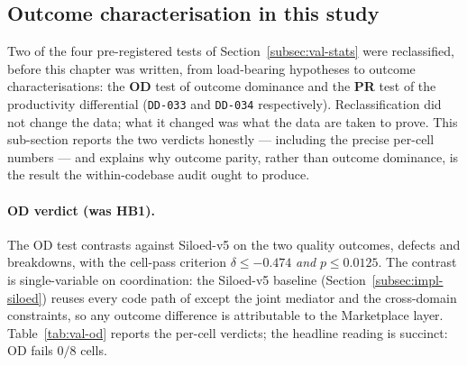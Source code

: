 \subsection{Outcome characterisation in this study}
\label{subsec:val-outcomes}

Two of the four pre-registered tests of Section~\ref{subsec:val-stats}
were reclassified, before this chapter was written, from
load-bearing hypotheses to outcome characterisations: the
\textbf{OD} test of outcome dominance and the \textbf{PR} test of
the productivity differential (\texttt{DD-033} and \texttt{DD-034}
respectively). Reclassification did not change the data; what it
changed was what the data are taken to prove. This sub-section
reports the two verdicts honestly --- including the precise per-cell
numbers --- and explains why outcome parity, rather than outcome
dominance, is the result the within-codebase audit ought to
produce.

\paragraph{OD verdict (was HB1).}
The OD test contrasts \NEXUS{} against Siloed-v5 on the two
quality outcomes, defects and breakdowns, with the cell-pass
criterion $\delta \le -0.474$ \emph{and} $p \le 0.0125$. The
contrast is single-variable on coordination: the Siloed-v5 baseline
(Section~\ref{subsec:impl-siloed}) reuses every code path of
\NEXUS{} except the joint mediator and the cross-domain
constraints, so any outcome difference is attributable to the
Marketplace layer. Table~\ref{tab:val-od} reports the per-cell
verdicts; the headline reading is succinct: OD fails $0/8$ cells.

